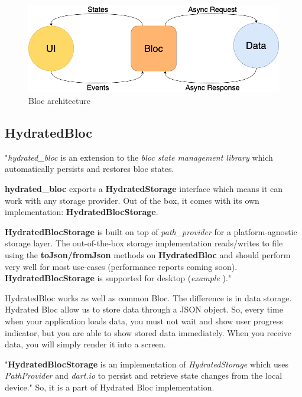 \begin{figure}
    \centering
    \includegraphics[scale=0.4]{assets/bloc_architecture.png}
    \caption{Bloc architecture\cite{bloc}}
    \label{fig:bloc-architecture}
\end{figure}

\subsection{HydratedBloc}\label{subsec:hydratedbloc}
"\textit{hydrated\_bloc} \cite{hydratedBlocPubDev} is an extension to the \textit{bloc state management library} \cite{bloc} which automatically persists and restores bloc states.

\textbf{hydrated\_bloc} exports a \textbf{HydratedStorage} interface which means it can work with any storage provider.
Out of the box, it comes with its own implementation: \textbf{HydratedBlocStorage}.

\textbf{HydratedBlocStorage} is built on top of \textit{path\_provider} \cite{pathProvider} for a platform-agnostic storage layer.
The out-of-the-box storage implementation reads/writes to file using the \textbf{toJson/fromJson} methods on \textbf{HydratedBloc} and should perform very well for most use-cases (performance reports coming soon).
\textbf{HydratedBlocStorage} is supported for desktop (\textit{example} \cite{hydratedBlocExample})."\cite{hydratedBlocTut}

HydratedBloc works as well as common Bloc.
The difference is in data storage.
Hydrated Bloc allow us to store data through a JSON object.
So, every time when your application loads data, you must not wait and show user progress indicator, but you are able to show stored data immediately.
When you receive data, you will simply render it into a screen.

"\textbf{HydratedBlocStorage} is an implementation of \textit{HydratedStorage} which uses \textit{PathProvider} and \textit{dart.io} to persist and retrieve state changes from the local device."\cite{hydratedBlocStorage}
So, it is a part of Hydrated Bloc implementation.